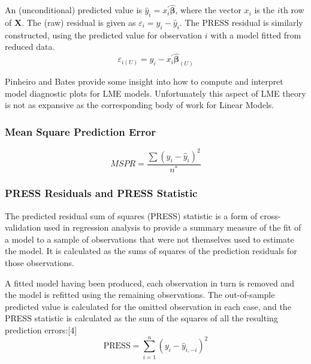 \documentclass[12pt, a4paper]{report}
\theoremstyle{plain}
\theoremstyle{definition}
\theoremstyle{remark}
\begin{document}
	
	
	
	An (unconditional) predicted value is $\hat{y}_i = x^{\prime}_i \boldsymbol{\hat{\beta}}$, where
	the vector $x_i$ is the $i$th row of $\boldsymbol{X}$.
	The (raw) residual is given as $\varepsilon_i = y_i - \hat{y}_i$. The PRESS residual is
	similarly constructed, using the predicted value for observation $i$ with a model fitted from reduced data.
	\[ \varepsilon_{i(U)} = y_i - x^{\prime}_i \boldsymbol{\hat{\beta}}_{(U)} \]
	
	
	
	
	Pinheiro and Bates provide some insight into how to compute and interpret model diagnostic plots for LME models. Unfortunately this aspect of LME theory is not as expansive as the corresponding body of work for Linear Models.
	
	
	
	
	
	
	
	
	
	
	
	
	

	\subsubsection{Mean Square Prediction Error}
	\begin{equation}
	MSPR = \frac{\sum (y_{i}-\hat{y}_{i})^2}{n^*}
	\end{equation}
	
\subsubsection{PRESS Residuals and PRESS Statistic}
	The predicted residual sum of squares (PRESS) statistic is a form of cross-validation used in regression analysis to provide a summary measure of the fit of a model to a sample of observations that were not themselves used to estimate the model. It is calculated as the sums of squares of the prediction residuals for those observations.
	
	A fitted model having been produced, each observation in turn is removed and the model is refitted using the remaining observations. The out-of-sample predicted value is calculated for the omitted observation in each case, and the PRESS statistic is calculated as the sum of the squares of all the resulting prediction errors:[4]
	\[\mbox{PRESS} =\sum_{i=1}^n (y_i - \hat{y}_{i, -i})^2 \]
\end{document}

